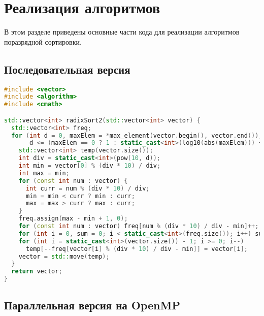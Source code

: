 \documentclass[]{article}
\theoremstyle{remark}
\theoremstyle{definition}
\begin{document}
\newpage


\section{Реализация алгоритмов}

\par В этом разделе приведены основные части кода для реализации алгоритмов поразрядной сортировки.

\subsection{Последовательная версия}

\begin{lstlisting}[language=C++]
#include <vector>
#include <algorithm>
#include <cmath>

std::vector<int> radixSort2(std::vector<int> vector) {
  std::vector<int> freq;
  for (int d = 0, maxElem = *max_element(vector.begin(), vector.end());
       d <= (maxElem == 0 ? 1 : static_cast<int>(log10(abs(maxElem))) + 1); d++) {
    std::vector<int> temp(vector.size());
    int div = static_cast<int>(pow(10, d));
    int min = vector[0] % (div * 10) / div;
    int max = min;
    for (const int num : vector) {
      int curr = num % (div * 10) / div;
      min = min < curr ? min : curr;
      max = max > curr ? max : curr;
    }
    freq.assign(max - min + 1, 0);
    for (const int num : vector) freq[num % (div * 10) / div - min]++;
    for (int i = 0, sum = 0; i < static_cast<int>(freq.size()); i++) sum += freq[i], freq[i] = sum;
    for (int i = static_cast<int>(vector.size()) - 1; i >= 0; i--)
      temp[--freq[vector[i] % (div * 10) / div - min]] = vector[i];
    vector = std::move(temp);
  }
  return vector;
}
\end{lstlisting}

\subsection{Параллельная версия на OpenMP}
\end{document}

